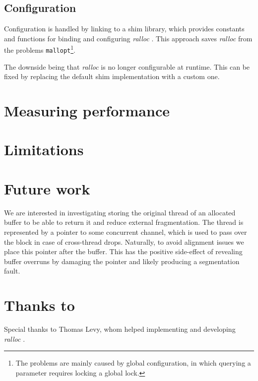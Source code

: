 \documentclass[11pt]{article}
\newcommand{\ralloc}{\emph{ralloc} }
\begin{document}
    \subsection{Configuration}
    Configuration is handled by linking to a shim library, which provides
    constants and functions for binding and configuring \ralloc. This approach
    saves \ralloc from the problems \texttt{mallopt}\footnote{The problems are
        mainly caused by global configuration, in which querying a parameter
        requires locking a global lock.}.

    The downside being that \ralloc is no longer configurable at runtime.
    This can be fixed by replacing the default shim implementation with a
    custom one.

    \section{Measuring performance}

    \section{Limitations}


    \section{Future work}

    We are interested in investigating storing the original thread of an
    allocated buffer to be able to return it and reduce external fragmentation.
    The thread is represented by a pointer to some concurrent channel, which
    is used to pass over the block in case of cross-thread drops. Naturally, to
    avoid alignment issues we place this pointer after the buffer. This has the
    positive side-effect of revealing buffer overruns by damaging the pointer
    and likely producing a segmentation fault.

    \section{Thanks to}

    Special thanks to Thomas Levy, whom helped implementing and developing
    \ralloc.

\end{document}
